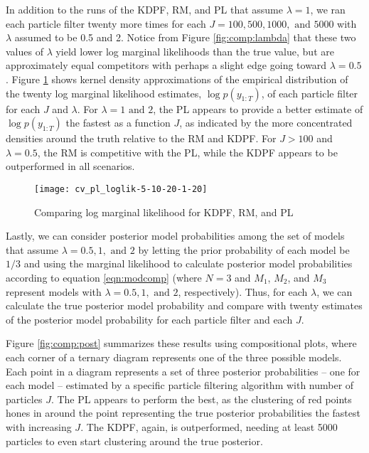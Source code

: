 In addition to the runs of the KDPF, RM, and PL that assume $\lambda = 1$, we ran each particle filter twenty more times for each $J = 100, 500, 1000, \mbox{ and } 5000$ with $\lambda$ assumed to be 0.5 and 2. Notice from Figure \ref{fig:comp:lambda} that these two values of $\lambda$ yield lower log marginal likelihoods than the true value, but are approximately equal competitors with perhaps a slight edge going toward $\lambda = 0.5$. Figure \ref{fig:comp:loglik} shows kernel density approximations of the empirical distribution of the twenty log marginal likelihood estimates, $\log p(y_{1:T})$, of each particle filter for each $J$ and $\lambda$. For $\lambda = 1 \mbox{ and } 2$, the PL appears to provide a better estimate of $\log p(y_{1:T})$ the fastest as a function $J$, as indicated by the more concentrated densities around the truth relative to the RM and KDPF. For $J > 100$ and $\lambda = 0.5$, the RM is competitive with the PL, while the KDPF appears to be outperformed in all scenarios.

\begin{figure}[ht]
\ssp
\centering
\caption{Comparing log marginal likelihood for KDPF, RM, and PL} \label{fig:comp:loglik}
\texttt{[image: cv\_pl\_loglik-5-10-20-1-20]}
\end{figure}

Lastly, we can consider posterior model probabilities among the set of models that assume $\lambda = 0.5, 1, \mbox{ and } 2$ by letting the prior probability of each model be $1/3$ and using the marginal likelihood to calculate posterior model probabilities according to equation \eqref{eqn:modcomp} (where $N = 3$ and $M_1$, $M_2$, and $M_3$ represent models with $\lambda = 0.5, 1, \mbox{ and } 2$, respectively). Thus, for each $\lambda$, we can calculate the true posterior model probability and compare with twenty estimates of the posterior model probability for each particle filter and each $J$. 

Figure \ref{fig:comp:post} summarizes these results using compositional plots, where each corner of a ternary diagram represents one of the three possible models. Each point in a diagram represents a set of three posterior probabilities -- one for each model -- estimated by a specific particle filtering algorithm with number of particles $J$. The PL appears to perform the best, as the clustering of red points hones in around the point representing the true posterior probabilities the fastest with increasing $J$. The KDPF, again, is outperformed, needing at least 5000 particles to even start clustering around the true posterior.

